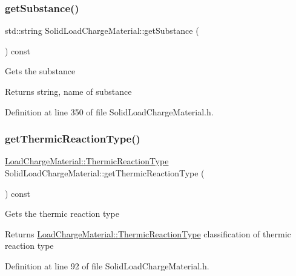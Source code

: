 \subsubsection{\texorpdfstring{get\+Substance()}{getSubstance()}\hspace{0.1cm}{\footnotesize\ttfamily [3/3]}}
{\footnotesize\ttfamily std\+::string Solid\+Load\+Charge\+Material\+::get\+Substance (\begin{DoxyParamCaption}{ }\end{DoxyParamCaption}) const\hspace{0.3cm}{\ttfamily [inline]}}

Gets the substance \begin{DoxyReturn}{Returns}
string, name of substance 
\end{DoxyReturn}


Definition at line 350 of file Solid\+Load\+Charge\+Material.\+h.

\mbox{\label{class_solid_load_charge_material_a11708312a99ab985d980e1e521e0864c}} 
\subsubsection{\texorpdfstring{get\+Thermic\+Reaction\+Type()}{getThermicReactionType()}\hspace{0.1cm}{\footnotesize\ttfamily [1/3]}}
{\footnotesize\ttfamily \hyperlink{class_load_charge_material_a51d4263e865a5d86236622dd3fe23fd1}{Load\+Charge\+Material\+::\+Thermic\+Reaction\+Type} Solid\+Load\+Charge\+Material\+::get\+Thermic\+Reaction\+Type (\begin{DoxyParamCaption}{ }\end{DoxyParamCaption}) const\hspace{0.3cm}{\ttfamily [inline]}}

Gets the thermic reaction type \begin{DoxyReturn}{Returns}
\hyperlink{class_load_charge_material_a51d4263e865a5d86236622dd3fe23fd1}{Load\+Charge\+Material\+::\+Thermic\+Reaction\+Type} classification of thermic reaction type 
\end{DoxyReturn}


Definition at line 92 of file Solid\+Load\+Charge\+Material.\+h.

